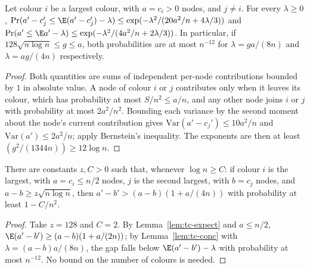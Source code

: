 \begin{lemma}\label{lem:tc-conc}
\leanok{}
Let colour $i$ be a largest colour, with $a=c_i>0$ nodes, and $j\ne i$. For every $\lambda\ge0$,
$\Pr(a'-c_j'\le\E(a'-c_j')-\lambda)\le\exp(-\lambda^2/(20a^2/n+4\lambda/3))$ and
$\Pr(a'\le\E a'-\lambda)\le\exp(-\lambda^2/(4a^2/n+2\lambda/3))$. In particular, if
$128\sqrt{n\log n}\le g\le a$, both probabilities are at most $n^{-12}$ for $\lambda=ga/(8n)$ and
$\lambda=ag/(4n)$ respectively.
\end{lemma}
\begin{proof}\leanok
Both quantities are sums of independent per-node contributions bounded by $1$ in absolute value. A
node of colour $i$ or $j$ contributes only when it leaves its colour, which has probability at most
$S/n^2\le a/n$, and any other node joins $i$ or $j$ with probability at most $2a^2/n^2$. Bounding
each variance by the second moment about the node's current contribution gives
$\mathrm{Var}(a'-c_j')\le10a^2/n$ and $\mathrm{Var}(a')\le2a^2/n$; apply Bernstein's inequality.
The exponents are then at least $(g^2/(1344n))\ge12\log n$.
\end{proof}

\begin{lemma}\label{lem:tc-distance}
\leanok{}
There are constants $z,C>0$ such that, whenever $\log n\ge C$: if colour $i$ is the largest, with
$a=c_i\le n/2$ nodes, $j$ is the second largest, with $b=c_j$ nodes, and $a-b\ge z\sqrt{n\log n}$,
then $a'-b'>(a-b)(1+a/(4n))$ with probability at least $1-C/n^2$.
\end{lemma}
\begin{proof}\leanok
Take $z=128$ and $C=2$. By Lemma~\ref{lem:tc-expect} and $a\le n/2$,
$\E(a'-b')\ge(a-b)(1+a/(2n))$; by Lemma~\ref{lem:tc-conc} with $\lambda=(a-b)a/(8n)$, the gap falls
below $\E(a'-b')-\lambda$ with probability at most $n^{-12}$. No bound on the number of colours is
needed.
\end{proof}

